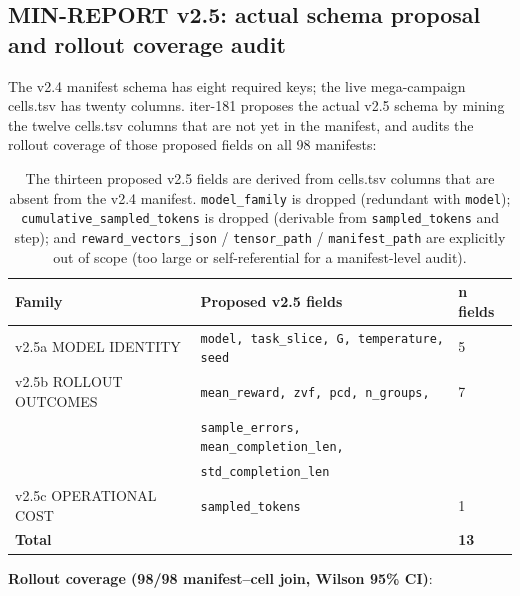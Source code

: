 \subsection{MIN-REPORT v2.5: actual schema proposal and rollout coverage audit}
\label{sec:p5-iter181-v25-rollout}

The v2.4 manifest schema has eight required keys; the live mega-campaign
cells.tsv has twenty columns. iter-181 proposes the actual v2.5 schema by
mining the twelve cells.tsv columns that are not yet in the manifest, and
audits the rollout coverage of those proposed fields on all 98 manifests:

\begin{table}[h]
\centering\small
\begin{tabular}{lll}
\hline
\textbf{Family} & \textbf{Proposed v2.5 fields} & \textbf{n fields} \\
\hline
v2.5a MODEL IDENTITY       & \texttt{model, task\_slice, G, temperature, seed}        & 5 \\
v2.5b ROLLOUT OUTCOMES     & \texttt{mean\_reward, zvf, pcd, n\_groups,}             & 7 \\
                            & \texttt{sample\_errors, mean\_completion\_len,}          &   \\
                            & \texttt{std\_completion\_len}                           &   \\
v2.5c OPERATIONAL COST     & \texttt{sampled\_tokens}                                & 1 \\
\hline
\textbf{Total} & & \textbf{13} \\
\hline
\end{tabular}
\caption{The thirteen proposed v2.5 fields are derived from cells.tsv
columns that are absent from the v2.4 manifest. \texttt{model\_family}
is dropped (redundant with \texttt{model}); \texttt{cumulative\_sampled\_tokens}
is dropped (derivable from \texttt{sampled\_tokens} and step); and
\texttt{reward\_vectors\_json} / \texttt{tensor\_path} / \texttt{manifest\_path}
are explicitly out of scope (too large or self-referential for a manifest-level audit).}
\label{tab:p5-v25-fields}
\end{table}

\noindent\textbf{Rollout coverage (98/98 manifest--cell join, Wilson 95\% CI)}:

